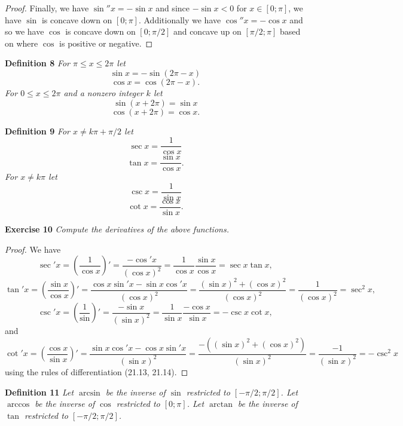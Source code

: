 \documentclass{article}
\begin{document}
\begin{flushleft}
\begin{proof}
Finally, we have $\sin'' x = -\sin x$ and since $- \sin x < 0$ for $x \in [0;\pi]$, we have $\sin$ is concave down on $[0;\pi]$. Additionally we have $\cos'' x = -\cos x$ and so we have $\cos$ is concave down on $[0;\pi/2]$ and concave up on $[\pi/2; \pi]$ based on where $\cos$ is positive or negative.
\end{proof}

\textbf{Definition 8}
\textsl{For $\pi \leq x \leq 2 \pi$ let
\[
\sin x = - \sin (2\pi - x)
\]
\[
\cos x = \cos (2\pi - x).
\]
For $0 \leq x \leq 2\pi$ and a nonzero integer $k$ let
\[
\sin (x + 2\pi) = \sin x
\]
\[
\cos (x + 2\pi) = \cos x.
\]}

\textbf{Definition 9}
\textsl{For $x \neq k \pi + \pi/2$ let
\[
\sec x = \frac{1}{\cos x}
\]
\[
\tan x = \frac{\sin x}{\cos x}.
\]
For $x \neq k \pi$ let
\[
\csc x = \frac{1}{\sin x}
\]
\[
\cot x = \frac{\cos x}{\sin x}.
\]}

\textbf{Exercise 10}
\textsl{Compute the derivatives of the above functions.}
\begin{proof}
We have
\[
\sec' x = \left ( \frac{1}{\cos x} \right )' = \frac{-\cos' x}{(\cos x)^2} = \frac{1}{\cos x} \frac{\sin x}{\cos x} = \sec x \tan x,
\]
\[
\tan' x = \left ( \frac{\sin x}{\cos x} \right )' = \frac{\cos x \sin' x - \sin x \cos' x}{(\cos x)^2} = \frac{(\sin x)^2 + (\cos x)^2}{(\cos x)^2} = \frac{1}{(\cos x)^2} = \sec^2 x,
\]
\[
\csc' x = \left ( \frac{1}{\sin} \right )' = \frac{-\sin x}{(\sin x)^2} = \frac{1}{\sin x} \frac{-\cos x}{\sin x} = -\csc x \cot x,
\]
and
\[
\cot' x = \left ( \frac{\cos x}{\sin x} \right )' = \frac{\sin x \cos' x - \cos x \sin' x}{(\sin x)^2} = \frac{-((\sin x)^2 + (\cos x)^2)}{(\sin x)^2} = \frac{-1}{(\sin x)^2} = -\csc^2 x
\]
using the rules of differentiation (21.13, 21.14).
\end{proof}

\textbf{Definition 11}
\textsl{Let $\arcsin$ be the inverse of $\sin$ restricted to $[-\pi/2; \pi/2]$. Let $\arccos$ be the inverse of $\cos$ restricted to $[0; \pi]$. Let $\arctan$ be the inverse of $\tan$ restricted to $[-\pi/2; \pi/2]$.}\newline


\end{flushleft}
\end{document}

